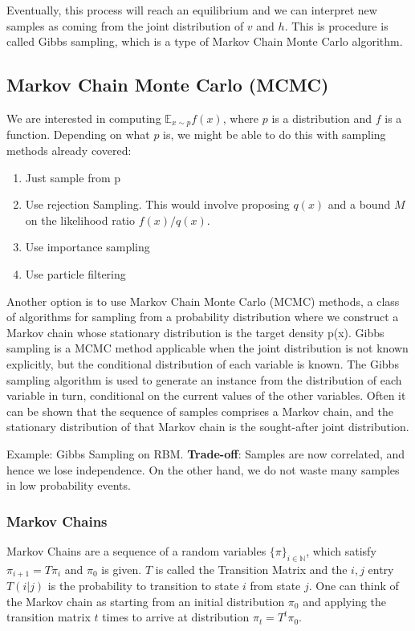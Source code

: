 \documentclass{article}
\begin{document}
Eventually, this process will reach an equilibrium and we can interpret new samples as coming from the joint distribution of $v$ and $h$. This is procedure is called Gibbs sampling, which is a type of Markov Chain Monte Carlo algorithm.

\subsection{Markov Chain Monte Carlo (MCMC)}

We are interested in computing $\mathbb{E}_{x \sim p} f(x)$, where $p$ is a distribution and $f$ is a function. Depending on what $p$ is, we might be able to do this with sampling methods already covered:
\begin{enumerate}
    \item Just sample from p
    \item Use rejection Sampling. This would involve proposing $q(x)$ and a bound $M$ on the likelihood ratio $f(x)/q(x)$.
    \item Use importance sampling    
     \item Use particle filtering

\end{enumerate}


Another option is to use Markov Chain Monte Carlo (MCMC) methods, a class of algorithms for sampling from a probability distribution where we construct a Markov chain whose stationary distribution is the target density p(x). Gibbs sampling is a MCMC method applicable when the joint distribution is not known explicitly, but the conditional
distribution of each variable is known. The Gibbs sampling algorithm is used to generate
an instance from the distribution of each variable in turn, conditional on the current values of
the other variables. Often it can be shown that the sequence of samples comprises a Markov chain, and
the stationary distribution of that Markov chain is the sought-after joint distribution. 


Example: Gibbs Sampling on RBM.
\textbf{Trade-off}: Samples are now correlated, and hence we lose independence. On the other hand, we do not waste many samples in low probability events.

\subsubsection{Markov Chains}

Markov Chains are a sequence of a random variables $\{\pi\}_{i \in \mathbb{N}}$, which satisfy $\pi_{i+1} = T \pi_i$ and $\pi_0$ is given. $T$ is called the Transition Matrix and the $i,j$ entry $T(i|j)$ is  the probability to transition to state $i$ from state $j$. One can think of the Markov chain as starting from an initial distribution $\pi_0$ and applying the transition matrix $t$ times to arrive at distribution $\pi_{t} = T^t \pi_0$. 
\end{document}
